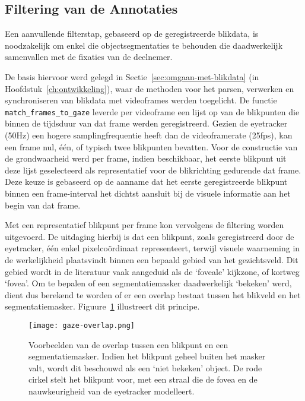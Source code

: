 \subsection{Filtering van de Annotaties}
\label{sec:filtering-annotaties}

Een aanvullende filterstap, gebaseerd op de geregistreerde blikdata, is noodzakelijk om enkel die objectsegmentaties 
te behouden die daadwerkelijk samenvallen met de fixaties van de deelnemer.

De basis hiervoor werd gelegd in Sectie~\ref{sec:omgaan-met-blikdata} (in Hoofdstuk~\ref{ch:ontwikkeling}), 
waar de methoden voor het parsen, verwerken en synchroniseren van blikdata met videoframes werden toegelicht. 
De functie \texttt{match\_frames\_to\_gaze} leverde per videoframe een lijst op van de blikpunten die binnen de tijdsduur 
van dat frame werden geregistreerd. 
Gezien de eyetracker (50Hz) een hogere samplingfrequentie heeft dan de videoframerate (25fps), 
kan een frame nul, één, of typisch twee blikpunten bevatten. 
Voor de constructie van de grondwaarheid werd per frame, indien beschikbaar, het eerste blikpunt uit deze lijst geselecteerd 
als representatief voor de blikrichting gedurende dat frame. 
Deze keuze is gebaseerd op de aanname dat het eerste geregistreerde blikpunt binnen een frame-interval 
het dichtst aansluit bij de visuele informatie aan het begin van dat frame.

Met een representatief blikpunt per frame kon vervolgens de filtering worden uitgevoerd. 
De uitdaging hierbij is dat een blikpunt, zoals geregistreerd door de eyetracker, één enkel pixelcoördinaat representeert, 
terwijl visuele waarneming in de werkelijkheid plaatsvindt binnen een bepaald gebied van het gezichtsveld. 
Dit gebied wordt in de literatuur vaak aangeduid als de `foveale' kijkzone, of kortweg `fovea'.
Om te bepalen of een segmentatiemasker daadwerkelijk `bekeken' werd, dient dus berekend te worden of er een 
overlap bestaat tussen het blikveld en het segmentatiemasker. Figuure~\ref{fig:gaze-overlap} illustreert dit principe.

\begin{figure}[H]
  \centering
  \texttt{[image: gaze-overlap.png]}
  \caption[]{\label{fig:gaze-overlap} 
    Voorbeelden van de overlap tussen een blikpunt en een segmentatiemasker.
    Indien het blikpunt geheel buiten het masker valt, wordt dit beschouwd als een `niet bekeken' object.
    De rode cirkel stelt het blikpunt voor, met een straal die de fovea en de nauwkeurigheid van de eyetracker modelleert.
  }
\end{figure}

